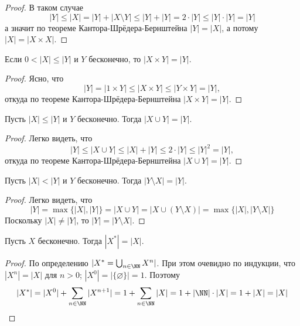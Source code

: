 \documentclass[12pt,a4paper]{article}
\newcommand{\ZFC}{\ensuremath{\mathrm{ZFC}}\xspace}
\begin{document}
\begin{proof}
        В таком случае
        \[|Y| \leqslant |X| = |Y| + |X \setminus Y| \leqslant |Y| + |Y| = 2 \cdot |Y| \leqslant |Y| \cdot |Y| = |Y|\]
        а значит по теореме Кантора-Шрёдера-Бернштейна $|Y| = |X|$, а потому $|X| = |X \times X|$.
    \end{proof}

    \begin{corollary}[в \ZFC]
        Если $0 < |X| \leqslant |Y|$ и $Y$ бесконечно, то $|X \times Y| = |Y|$.
    \end{corollary}

    \begin{proof}
        Ясно, что
        \[|Y| = |1 \times Y| \leqslant |X \times Y| \leqslant |Y \times Y| = |Y|,\]
        откуда по теореме Кантора-Шрёдера-Бернштейна $|X \times Y| = |Y|$.
    \end{proof}

    \begin{corollary}
        Пусть $|X| \leqslant |Y|$ и $Y$ бесконечно. Тогда $|X \cup Y| = |Y|$.
    \end{corollary}

    \begin{proof}
        Легко видеть, что
        \[|Y| \leqslant |X \cup Y| \leqslant |X| + |Y| \leqslant 2 \cdot |Y| \leqslant |Y|^2 = |Y|,\]
        откуда по теореме Кантора-Шрёдера-Бернштейна $|X \cup Y| = |Y|$.
    \end{proof}

    \begin{corollary}
        Пусть $|X| < |Y|$ и $Y$ бесконечно. Тогда $|Y \setminus X| = |Y|$.
    \end{corollary}

    \begin{proof}
        Легко видеть, что
        \[|Y| = \max\{|X|, |Y|\} = |X \cup Y| = |X \cup (Y \setminus X)| = \max\{|X|, |Y \setminus X|\}\]
        Поскольку $|X| \neq |Y|$, то $|Y| = |Y \setminus X|$.
    \end{proof}

    \begin{corollary}
        Пусть $X$ бесконечно. Тогда $|X^*| = |X|$.
    \end{corollary}

    \begin{proof}
        По определению $|X^* = \bigcup_{n \in \NN} X^n|$. При этом очевидно по индукции, что $|X^n| = |X|$ для $n > 0$; $|X^0| = |\{\varnothing\}| = 1$. Поэтому
        \[|X^*| = |X^0| + \sum_{n \in \NN} |X^{n+1}| = 1 + \sum_{n \in \NN} |X| = 1 + |\NN| \cdot |X| = 1 + |X| = |X|\]
    \end{proof}
\end{document}

